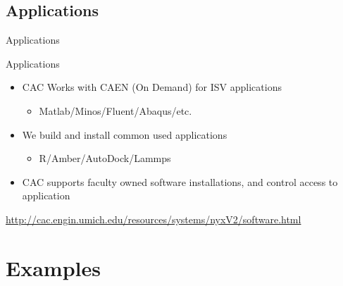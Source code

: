 \documentclass[handout]{beamer}
\begin{document}
    \subsection{Applications}
     \begin{frame}{Applications}
      \begin{block}{Applications}
       \begin{itemize}
        \item CAC Works with CAEN (On Demand) for ISV applications
        \begin{itemize}
          \item Matlab/Minos/Fluent/Abaqus/etc.
        \end{itemize}
        \item We build and install common used applications
        \begin{itemize}
          \item R/Amber/AutoDock/Lammps
        \end{itemize}
        \item CAC supports faculty owned software installations, and control access to application
       \end{itemize}
      \end{block}
      \url{http://cac.engin.umich.edu/resources/systems/nyxV2/software.html}
     \end{frame}
  \section{Examples}
\end{document}
